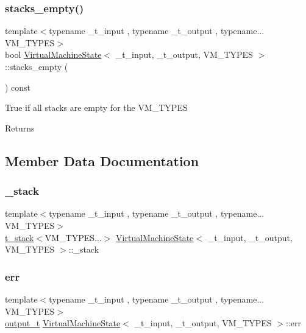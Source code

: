 \subsubsection{\texorpdfstring{stacks\+\_\+empty()}{stacks\_empty()}}
{\footnotesize\ttfamily template$<$typename \+\_\+t\+\_\+input , typename \+\_\+t\+\_\+output , typename... V\+M\+\_\+\+T\+Y\+P\+ES$>$ \\
bool \hyperlink{class_virtual_machine_state}{Virtual\+Machine\+State}$<$ \+\_\+t\+\_\+input, \+\_\+t\+\_\+output, V\+M\+\_\+\+T\+Y\+P\+ES $>$\+::stacks\+\_\+empty (\begin{DoxyParamCaption}{ }\end{DoxyParamCaption}) const\hspace{0.3cm}{\ttfamily [inline]}}

True if all stacks are empty for the V\+M\+\_\+\+T\+Y\+P\+ES \begin{DoxyReturn}{Returns}

\end{DoxyReturn}


\subsection{Member Data Documentation}
\mbox{\label{class_virtual_machine_state_a55e2a8e32597a15740e9e38ae539200c}} 
\subsubsection{\texorpdfstring{\+\_\+stack}{\_stack}}
{\footnotesize\ttfamily template$<$typename \+\_\+t\+\_\+input , typename \+\_\+t\+\_\+output , typename... V\+M\+\_\+\+T\+Y\+P\+ES$>$ \\
\hyperlink{struct_virtual_machine_state_1_1t__stack}{t\+\_\+stack}$<$V\+M\+\_\+\+T\+Y\+P\+E\+S...$>$ \hyperlink{class_virtual_machine_state}{Virtual\+Machine\+State}$<$ \+\_\+t\+\_\+input, \+\_\+t\+\_\+output, V\+M\+\_\+\+T\+Y\+P\+ES $>$\+::\+\_\+stack}

\mbox{\label{class_virtual_machine_state_aa3eaa4b1432d1604b86039d2ff0faae1}} 
\subsubsection{\texorpdfstring{err}{err}}
{\footnotesize\ttfamily template$<$typename \+\_\+t\+\_\+input , typename \+\_\+t\+\_\+output , typename... V\+M\+\_\+\+T\+Y\+P\+ES$>$ \\
\hyperlink{class_virtual_machine_state_a005a025f97d9505b00e7f9f0e99002bb}{output\+\_\+t} \hyperlink{class_virtual_machine_state}{Virtual\+Machine\+State}$<$ \+\_\+t\+\_\+input, \+\_\+t\+\_\+output, V\+M\+\_\+\+T\+Y\+P\+ES $>$\+::err}

